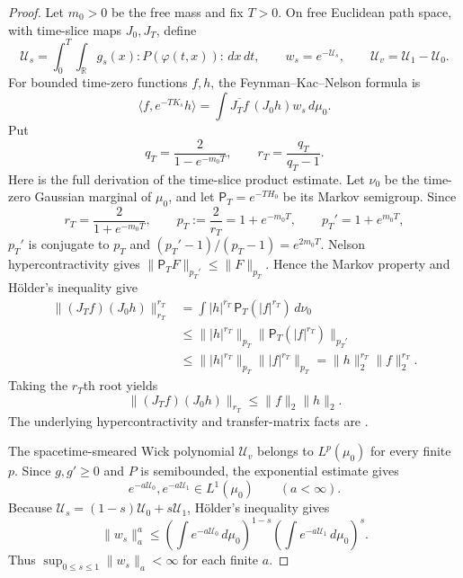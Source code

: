 \documentclass[11pt,a4paper]{article}
\theoremstyle{remark}
\newcommand{\R}{\mathbb R}
\begin{document}
\begin{proof}
Let $m_0>0$ be the free mass and fix $T>0$.  On free Euclidean path space, with time-slice maps
$J_0,J_T$, define
\[
 \mathcal U_s=\int_0^T\!\int_{\R}g_s(x):P(\varphi(t,x)):\,dx\,dt,
 \qquad w_s=e^{-\mathcal U_s},
 \qquad \mathcal U_v=\mathcal U_1-\mathcal U_0.
\]
For bounded time-zero functions $f,h$, the Feynman--Kac--Nelson formula is
\begin{equation}\label{eq:FKN}
 \langle f,e^{-TK_s}h\rangle
 =\int \overline{J_Tf}\,(J_0h)w_s\,d\mu_0.                 \tag{1.1}
\end{equation}
Put
\[
 q_T=\frac{2}{1-e^{-m_0T}},\qquad r_T=\frac{q_T}{q_T-1}.
\]
Here is the full derivation of the time-slice product estimate.  Let $\nu_0$ be the time-zero
Gaussian marginal of $\mu_0$, and let $\mathsf P_T=e^{-TH_0}$ be its Markov semigroup.  Since
\[
 r_T=\frac{2}{1+e^{-m_0T}},\qquad
 p_T:=\frac2{r_T}=1+e^{-m_0T},\qquad p_T'=1+e^{m_0T},
\]
$p_T'$ is conjugate to $p_T$ and
$(p_T'-1)/(p_T-1)=e^{2m_0T}$.  Nelson hypercontractivity gives
$\|\mathsf P_TF\|_{p_T'}\le\|F\|_{p_T}$.  Hence the Markov property and H\"older's inequality
give
\begin{align*}
 \|(J_Tf)(J_0h)\|_{r_T}^{r_T}
 &=\int |h|^{r_T}\,\mathsf P_T(|f|^{r_T})\,d\nu_0\\
 &\le\||h|^{r_T}\|_{p_T}
       \|\mathsf P_T(|f|^{r_T})\|_{p_T'}\\
 &\le\||h|^{r_T}\|_{p_T}\||f|^{r_T}\|_{p_T}
 =\|h\|_2^{r_T}\|f\|_2^{r_T}.
\end{align*}
Taking the $r_T$th root yields
\begin{equation}\label{eq:timeslice}
 \|(J_Tf)(J_0h)\|_{r_T}\le\|f\|_2\|h\|_2.                \tag{1.2}
\end{equation}
The underlying hypercontractivity and transfer-matrix facts are
\cite[Thms.~V.10 and V.12]{Simon}.

The spacetime-smeared Wick polynomial $\mathcal U_v$ belongs to $L^p(\mu_0)$ for every finite
$p$.  Since $g,g'\ge0$ and $P$ is semibounded, the exponential estimate
\cite[Thm.~V.7]{Simon} gives
\[
 e^{-a\mathcal U_0},e^{-a\mathcal U_1}\in L^1(\mu_0)
 \qquad(a<\infty).
\]
Because $\mathcal U_s=(1-s)\mathcal U_0+s\mathcal U_1$, H\"older's inequality gives
\begin{equation}\label{eq:FKNmoments}
 \|w_s\|_a^a
 \le
 \left(\int e^{-a\mathcal U_0}\,d\mu_0\right)^{1-s}
 \left(\int e^{-a\mathcal U_1}\,d\mu_0\right)^s.          \tag{1.3}
\end{equation}
Thus $\sup_{0\le s\le1}\|w_s\|_a<\infty$ for each finite $a$.


\end{proof}
\end{document}
